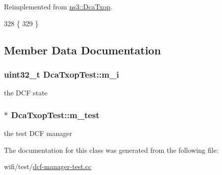 Reimplemented from \hyperlink{classns3_1_1DcaTxop_ae5e42a39be0fc0fd8796df97f7bd19b6}{ns3\+::\+Dca\+Txop}.


\begin{DoxyCode}
328 \{
329 \}
\end{DoxyCode}


\subsection{Member Data Documentation}
\subsubsection[{\texorpdfstring{m\+\_\+i}{m_i}}]{\setlength{\rightskip}{0pt plus 5cm}uint32\+\_\+t Dca\+Txop\+Test\+::m\+\_\+i\hspace{0.3cm}{\ttfamily [private]}}\hypertarget{classDcaTxopTest_a87bda3c2a148ac8b18aecfb90ba1573f}{}\label{classDcaTxopTest_a87bda3c2a148ac8b18aecfb90ba1573f}


the D\+CF state 

\subsubsection[{\texorpdfstring{m\+\_\+test}{m_test}}]{$\ast$ Dca\+Txop\+Test\+::m\+\_\+test\hspace{0.3cm}{\ttfamily [private]}}\hypertarget{classDcaTxopTest_a31130e8c78aa3cc7c80d63d2ec4f86d3}{}\label{classDcaTxopTest_a31130e8c78aa3cc7c80d63d2ec4f86d3}


the test D\+CF manager 



The documentation for this class was generated from the following file\+:\begin{DoxyCompactItemize}
\item 
wifi/test/\hyperlink{dcf-manager-test_8cc}{dcf-\/manager-\/test.\+cc}\end{DoxyCompactItemize}
